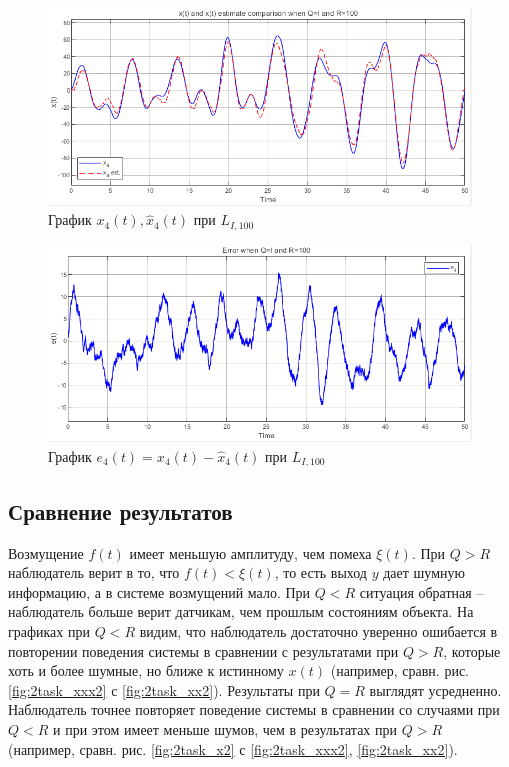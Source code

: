 \documentclass[a4paper, 12pt]{article}
\begin{document}
    \begin{figure}[H]
        \centering
        \includegraphics[scale=0.75]{2task_xxx4.png}
        \captionsetup{skip=0pt}
        \caption{График $x_4(t),\hat{x}_4(t)$ при $L_{I,100}$}
        \label{fig:2task_xxx4}
    \end{figure}
    \begin{figure}[H]
        \centering
        \includegraphics[scale=0.75]{2task_eee4.png}
        \captionsetup{skip=0pt}
        \caption{График $e_4(t)=x_4(t)-\hat{x}_4(t)$ при $L_{I,100}$}
        \label{fig:2task_eee4}
    \end{figure}


    \subsection{Сравнение результатов}
    Возмущение $f(t)$ имеет меньшую амплитуду, чем помеха $\xi(t)$. При $Q>R$
    наблюдатель верит в то, что $f(t)<\xi(t)$, то есть выход $y$ дает
    шумную информацию, а в системе возмущений мало. При $Q<R$ ситуация обратная
    -- наблюдатель больше верит датчикам, чем прошлым состояниям объекта.
    На графиках при $Q<R$ видим, что наблюдатель достаточно уверенно ошибается
    в повторении поведения системы в сравнении с результатами при $Q>R$, которые
    хоть и более шумные, но ближе к истинному $x(t)$
    (например, сравн. рис. \ref{fig:2task_xxx2} с \ref{fig:2task_xx2}).
    Результаты при $Q=R$ выглядят усредненно. Наблюдатель точнее повторяет
    поведение системы в сравнении со случаями при $Q<R$ и при этом имеет
    меньше шумов, чем в результатах при $Q>R$ (например, сравн. рис. \ref{fig:2task_x2} с \ref{fig:2task_xxx2}, \ref{fig:2task_xx2}).
\end{document}
